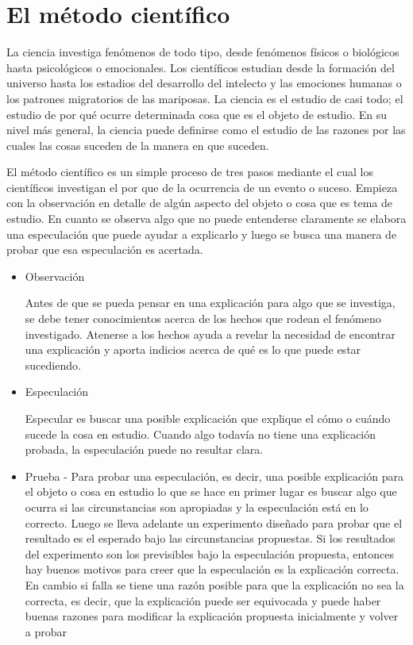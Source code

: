 \section{El método científico}
     La ciencia investiga fenómenos de todo tipo, desde fenómenos físicos o biológicos hasta psicológicos o emocionales. Los científicos estudian desde la formación del universo hasta los estadios del desarrollo del intelecto y las emociones humanas o los patrones migratorios de las mariposas. La ciencia es el estudio de casi todo; el estudio de por qué ocurre determinada cosa que es el objeto de estudio. En su nivel más general, la ciencia puede definirse como el estudio de las razones por las cuales las cosas suceden de la manera en que suceden.

El método científico es un simple proceso de tres pasos mediante el cual los científicos investigan el por que de la ocurrencia de un evento o suceso. Empieza con la observación en detalle de algún aspecto del objeto o cosa que es tema de estudio. En cuanto se observa algo que no puede entenderse claramente se elabora una especulación que puede ayudar a explicarlo y luego se busca una manera de probar que esa especulación es acertada. 

\begin{itemize}
	\item {Observación}
	
	Antes de que se pueda pensar en una explicación para algo que se investiga, se debe tener conocimientos acerca de los hechos que rodean el fenómeno investigado. Atenerse a los hechos ayuda a revelar la necesidad de encontrar una explicación y aporta indicios acerca de qué es lo que puede estar sucediendo.

	\item {Especulación}
	
	Especular es buscar una posible explicación que explique el cómo o cuándo sucede la cosa en estudio. Cuando algo todavía no tiene una explicación probada, la especulación puede no resultar clara. 
	
	\item {Prueba}
		- Para probar una especulación, es decir, una posible explicación para el objeto o cosa en estudio lo que se hace en primer lugar es buscar algo que ocurra si las circunstancias son apropiadas y la especulación está en lo correcto. Luego se lleva adelante un experimento diseñado para probar que el resultado es el esperado bajo las circunstancias propuestas. Si los resultados del experimento son los previsibles bajo la especulación propuesta, entonces hay buenos motivos para creer que la especulación es la explicación correcta. En cambio si falla se tiene una razón posible para que la explicación no sea la correcta, es decir, que la explicación puede ser equivocada y puede haber buenas razones para modificar la explicación propuesta inicialmente y volver a probar \cite{carey2011beginner}

\end{itemize} 

